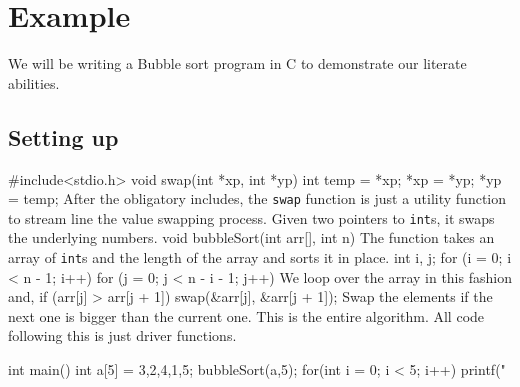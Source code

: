 \documentclass{article}
\newenvironment{code}{\footnotesize\verbatim}{\endverbatim\normalsize}
\begin{document}
\section{Example}
We will be writing a Bubble sort program in C to demonstrate our literate abilities.

\subsection{Setting up}
\begin{code}
    #include<stdio.h>
    void swap(int *xp, int *yp) {
    int temp = *xp;
    *xp = *yp;
    *yp = temp;
    }
\end{code}
After the obligatory includes, the \verb|swap| function is just a utility function to stream line the value swapping process. Given two pointers to \verb|int|s, it swaps the underlying numbers.
\begin{code}
    void bubbleSort(int arr[], int n) {
\end{code}
The function takes an array of \verb|int|s and the length of the array and sorts it in place.
\begin{code}
    int i, j;
    for (i = 0; i < n - 1; i++)
        for (j = 0; j < n - i - 1; j++)
\end{code}
We loop over the array in this fashion and,
\begin{code}
            if (arr[j] > arr[j + 1])
                swap(&arr[j], &arr[j + 1]);
\end{code}
Swap the elements if the next one is bigger than the current one.
\begin{code}
    }
\end{code}
This is the entire algorithm. All code following this is just driver functions.

\begin{code}
    int main(){
        int a[5] = {3,2,4,1,5};
        bubbleSort(a,5);
        for(int i = 0; i < 5; i++){
            printf("%
        }
    }
\end{code}
\end{document}
